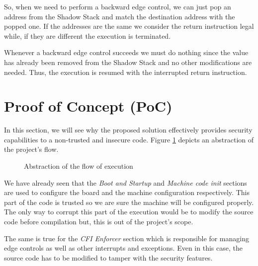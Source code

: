 So, when we need to perform a backward edge control, we can just pop an address from
the Shadow Stack and match the destination address with the popped one. If the
addresses are the same we consider the return instruction legal while, if they are
different the execution is terminated.

Whenever a backward edge control succeeds we must do nothing since the value has
already been removed from the Shadow Stack and no other modifications are needed.
Thus, the execution is resumed with the interrupted return instruction.

\section{Proof of Concept (PoC)}
\label{sec:project_poc}

In this section, we will see why the proposed solution effectively provides security
capabilities to a non-trusted and insecure code. Figure \ref{fig:functioning}
depicts an abstraction of the project's flow.

\begin{figure}[htbp]
  \centering
  \def\stackalignment{r} %
  {\scriptsize }
  \caption{Abstraction of the flow of execution}
  \label{fig:functioning}
\end{figure}

We have already seen that the \textit{Boot and Startup} and \textit{Machine code
init} sections are used to configure the board and the machine configuration respectively.
This part of the code is trusted so we are sure the machine will be configured
properly. The only way to corrupt this part of the execution would be to modify the
source code before compilation but, this is out of the project's scope.

The same is true for the \textit{CFI Enforcer} section which is responsible for managing
edge controls as well as other interrupts and exceptions. Even in this case, the
source code has to be modified to tamper with the security features.

